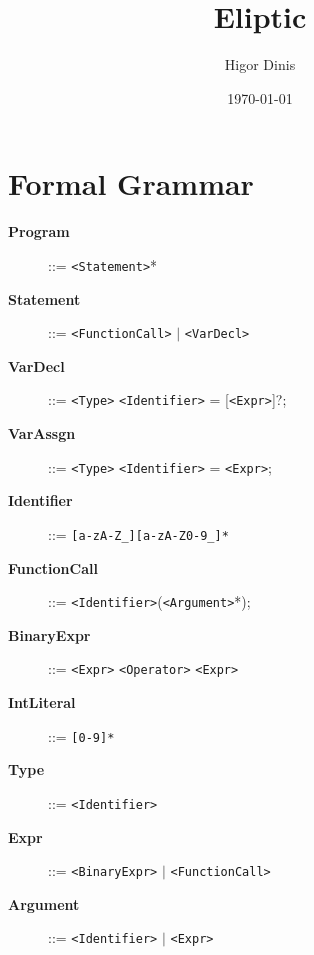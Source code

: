 \documentclass{article}
\begin{document}
\title{Eliptic}
\author{Higor Dinis}
\date{\today}
\maketitle

\section{Formal Grammar}

\begin{description}
  \item[\textbf{Program}] ::= \texttt{<Statement>}*
  \item[\textbf{Statement}] ::= \texttt{<FunctionCall>} $|$ \texttt{<VarDecl>}
  \item[\textbf{VarDecl}] ::= \texttt{<Type>} \texttt{<Identifier>} = [\texttt{<Expr>}]?;
  \item[\textbf{VarAssgn}] ::= \texttt{<Type>} \texttt{<Identifier>} = \texttt{<Expr>};
  \item[\textbf{Identifier}] ::= \texttt{[a-zA-Z\_][a-zA-Z0-9\_]*}
  \item[\textbf{FunctionCall}] ::= \texttt{<Identifier>}(\texttt{<Argument>}*);
  \item[\textbf{BinaryExpr}] ::= \texttt{<Expr>} \texttt{<Operator>} \texttt{<Expr>}
  \item[\textbf{IntLiteral}] ::= \texttt{[0-9]*}
  \item[\textbf{Type}] ::= \texttt{<Identifier>}
  \item[\textbf{Expr}] ::= \texttt{<BinaryExpr>} $|$ \texttt{<FunctionCall>}
  \item[\textbf{Argument}] ::= \texttt{<Identifier>} $|$ \texttt{<Expr>}
\end{description}
\end{document}

